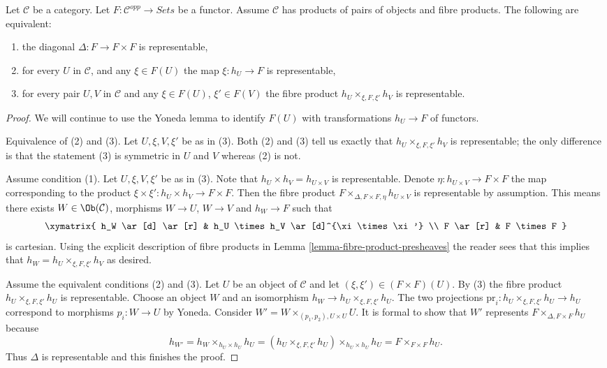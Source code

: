\begin{lemma}
\label{lemma-representable-diagonal}
Let $\mathcal{C}$ be a category.
Let $F : \mathcal{C}^{opp} \to \textit{Sets}$ be a functor.
Assume $\mathcal{C}$ has products of pairs of objects and fibre products.
The following are equivalent:
\begin{enumerate}
\item the diagonal $\Delta : F \to F \times F$ is representable,
\item for every $U$ in $\mathcal{C}$,
and any $\xi \in F(U)$ the map $\xi : h_U \to F$ is representable,
\item for every pair $U, V$ in $\mathcal{C}$
and any $\xi \in F(U)$, $\xi' \in F(V)$ the fibre product
$h_U \times_{\xi, F, \xi'} h_V$ is representable.
\end{enumerate}
\end{lemma}

\begin{proof}
We will continue to use the Yoneda lemma to identify $F(U)$
with transformations $h_U \to F$ of functors.

\medskip\noindent
Equivalence of (2) and (3). Let $U, \xi, V, \xi'$ be as in (3).
Both (2) and (3) tell us exactly that $h_U \times_{\xi, F, \xi'} h_V$
is representable; the only difference is that the statement
(3) is symmetric in $U$ and $V$ whereas (2) is not.

\medskip\noindent
Assume condition (1). Let $U, \xi, V, \xi'$
be as in (3). Note that $h_U \times h_V = h_{U \times V}$ is representable.
Denote $\eta : h_{U \times V} \to F \times F$ the map
corresponding to the product $\xi \times \xi' : h_U \times h_V \to F \times F$.
Then the fibre product $F \times_{\Delta, F \times F, \eta} h_{U \times V}$
is representable by assumption. This means there exists
$W \in \Ob(\mathcal{C})$, morphisms
$W \to U$, $W \to V$ and $h_W \to F$ such that
$$
\xymatrix{
h_W \ar[d] \ar[r] & h_U \times h_V \ar[d]^{\xi \times \xi'} \\
F \ar[r] & F \times F
}
$$
is cartesian. Using the explicit description of fibre products
in Lemma \ref{lemma-fibre-product-presheaves} the reader sees that this
implies that $h_W = h_U \times_{\xi, F, \xi'} h_V$ as desired.

\medskip\noindent
Assume the equivalent conditions (2) and (3). Let $U$ be an object
of $\mathcal{C}$ and let $(\xi, \xi') \in (F \times F)(U)$.
By (3) the fibre product $h_U \times_{\xi, F, \xi'} h_U$ is
representable. Choose an object $W$ and an isomorphism
$h_W \to h_U \times_{\xi, F, \xi'} h_U$. The two projections
$\text{pr}_i : h_U \times_{\xi, F, \xi'} h_U \to h_U$
correspond to morphisms $p_i : W \to U$ by Yoneda. Consider
$W' = W \times_{(p_1, p_2), U \times U} U$. It is formal
to show that $W'$ represents $F \times_{\Delta, F \times F} h_U$
because
$$
h_{W'} =  h_W \times_{h_U \times h_U} h_U
= (h_U \times_{\xi, F, \xi'} h_U) \times_{h_U \times h_U} h_U
= F \times_{F \times F} h_U.
$$
Thus $\Delta$ is representable and this finishes the proof.
\end{proof}









